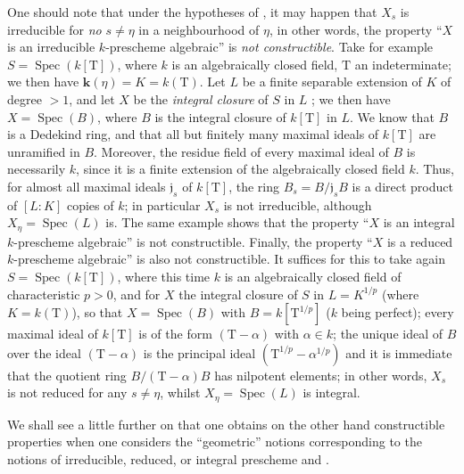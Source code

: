 \begin{remark}[9.5.7]
\label{IV.9.5.7}
One should note that under the hypotheses of , it may happen that $X_s$ is irreducible for \emph{no} $s\neq\eta$ in a neighbourhood of $\eta$, in other words, the property ``$X$ is an irreducible $k$-prescheme algebraic'' is \emph{not constructible}.
Take for example $S=\operatorname{Spec}(k[\mathrm{T}])$, where $k$ is an algebraically closed field, $\mathrm{T}$ an indeterminate; we then have $\boldsymbol{k}(\eta)=K=k(\mathrm{T})$.
Let $L$ be a finite separable extension of $K$ of degree $>1$, and let $X$ be the \emph{integral closure} of $S$ in $L$ ; we then have $X=\operatorname{Spec}(B)$, where $B$ is the integral closure of $k[\mathrm{T}]$ in $L$.
We know that $B$ is a Dedekind ring, and that all but finitely many maximal ideals of $k[\mathrm{T}]$ are unramified in $B$. Moreover, the residue field of every maximal ideal of $B$ is necessarily $k$, since it is a finite extension of the algebraically closed field $k$. Thus, for almost all maximal ideals $\mathfrak{j}_s$ of $k[\mathrm{T}]$, the ring $B_s=B/\mathfrak{j}_s B$ is a direct product of $[L:K]$ copies of $k$; in particular $X_s$ is not irreducible, although $X_\eta=\operatorname{Spec}(L)$ is.
The same example shows that the property ``$X$ is an integral $k$-prescheme algebraic'' is not constructible.
Finally, the property ``$X$ is a reduced $k$-prescheme algebraic'' is also not constructible.
It suffices for this to take again $S=\operatorname{Spec}(k[\mathrm{T}])$, where this time $k$ is an algebraically closed field of characteristic $p>0$, and for $X$ the integral closure of $S$ in $L=K^{1/p}$ (where $K=k(\mathrm{T})$), so that $X=\operatorname{Spec}(B)$ with $B=k[\mathrm{T}^{1/p}]$ ($k$ being perfect); every maximal ideal of $k[\mathrm{T}]$ is of the form $(\mathrm{T}-\alpha)$ with $\alpha\in k$; the unique ideal of $B$ over the ideal $(\mathrm{T}-\alpha)$ is the principal ideal $(\mathrm{T}^{1/p}-\alpha^{1/p})$ and it is immediate
that the quotient ring $B/(\mathrm{T}-\alpha)B$ has nilpotent elements; in other words, $X_s$ is not reduced for any $s\neq\eta$, whilst $X_\eta=\operatorname{Spec}(L)$ is integral.

We shall see a little further on  that one obtains on the other hand constructible properties when one considers the ``geometric'' notions corresponding to the notions of irreducible, reduced, or integral prescheme  and .
\end{remark}


